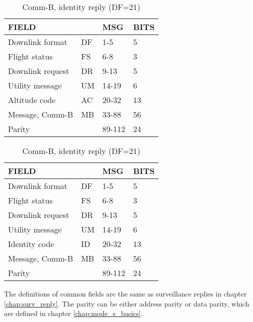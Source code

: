 \begin{table}[!ht]
\caption{Comm-B messages with altitude code and identity code}
\label{tb:df_20_21_structure}

\begin{subtable}[t]{.6\linewidth}
  \centering
  \caption{Comm-B, altitude reply (DF=20)}
  \begin{tabular}[t]{|l|l|l|l|}
  \hline
  \textbf{FIELD} & \textbf{} & \textbf{MSG} & \textbf{BITS} \\ \hline
  Downlink format         & DF & 1-5    & 5   \\ \hline
  Flight status           & FS & 6-8    & 3   \\ \hline
  Downlink request        & DR & 9-13   & 5   \\ \hline
  Utility message         & UM & 14-19  & 6   \\ \hline
  Altitude code           & AC & 20-32  & 13  \\ \hline
  Message, Comm-B         & MB & 33-88  & 56  \\ \hline
  Parity  &  & 89-112  & 24  \\ \hline
  \end{tabular}
\end{subtable}%

\vspace{0.5cm}

\begin{subtable}[t]{.6\linewidth}
  \centering
  \caption{Comm-B, identity reply (DF=21)}
  \begin{tabular}[t]{|l|l|l|l|}
  \hline
  \textbf{FIELD} & \textbf{} & \textbf{MSG} & \textbf{BITS} \\ \hline
  Downlink format         & DF & 1-5    & 5   \\ \hline
  Flight status           & FS & 6-8    & 3   \\ \hline
  Downlink request        & DR & 9-13   & 5   \\ \hline
  Utility message         & UM & 14-19  & 6   \\ \hline
  Identity code           & ID & 20-32  & 13  \\ \hline
  Message, Comm-B         & MB & 33-88  & 56  \\ \hline
  Parity  &  & 89-112  & 24  \\ \hline
  \end{tabular}
\end{subtable}
\end{table}

The definitions of common fields are the same as surveillance replies in chapter \ref{chap:surv_reply}. The parity can be either address parity or data parity, which are defined in chapter \ref{chap:mode_s_basics}.


